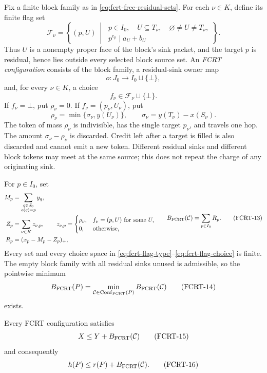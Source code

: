 Fix a finite block family as in \eqref{eq:fcrt-free-residual-sets}.  For each
$\nu\in K$, define its finite flag set
\[
 \mathcal F_\nu=
 \left\{(p,U)\ \middle|\
 \begin{array}{l}
 p\in I_0,\quad U\subseteq T_\nu,\quad
 \varnothing\ne U\ne T_\nu,\\[2pt]
 p^{e_p}\mid a_U+b_U
 \end{array}
 \right\}.
\tag{FCRT-10}\label{eq:fcrt-flag-type}
\]
Thus $U$ is a nonempty proper face of the block's sink packet, and the target
$p$ is residual, hence lies outside every selected block source set.  An
\emph{FCRT configuration} consists of the block family, a residual-sink
owner map
\[
                        o:J_0\longrightarrow I_0\sqcup\{\bot\},
\]
and, for every $\nu\in K$, a choice
\[
 f_\nu\in\mathcal F_\nu\sqcup\{\bot\}.
\tag{FCRT-11}\label{eq:fcrt-flag-choice}
\]
If $f_\nu=\bot$, put $\rho_\nu=0$.  If
$f_\nu=(p_\nu,U_\nu)$, put
\[
 \rho_\nu=\min\{\sigma_\nu,y(U_\nu)\},
 \qquad \sigma_\nu=y(T_\nu)-x(S_\nu).
\tag{FCRT-12}\label{eq:fcrt-reuse-cap}
\]
The token of mass $\rho_\nu$ is indivisible, has the single target $p_\nu$,
and travels one hop.  The amount $\sigma_\nu-\rho_\nu$ is discarded.  Credit
left after a target is filled is also discarded and cannot emit a new token.
Different residual sinks and different block tokens may meet at the same
source; this does not repeat the charge of any originating sink.

For $p\in I_0$, set
\[
 \begin{split}
 M_p&=\sum_{\substack{q\in J_0\\o(q)=p}}y_q,\\
 Z_p&=\sum_{\nu\in K}z_{\nu,p},
 \qquad
 z_{\nu,p}=
 \begin{cases}
  \rho_\nu,&f_\nu=(p,U)\text{ for some }U,\\
  0,&\text{otherwise},
 \end{cases}\\
 R_p&=(x_p-M_p-Z_p)_+,
 \end{split}
 \qquad
 B_{\rm FCRT}(\mathcal C)=\sum_{p\in I_0}R_p.
\tag{FCRT-13}\label{eq:fcrt-boundary}
\]
Every set and every choice space in
\eqref{eq:fcrt-flag-type}--\eqref{eq:fcrt-flag-choice} is finite.  The empty
block family with all residual sinks unused is admissible, so the pointwise
minimum
\[
 B_{\rm FCRT}(P)=\min_{\mathcal C\in\operatorname{Conf}_{\rm FCRT}(P)}
                         B_{\rm FCRT}(\mathcal C)
\tag{FCRT-14}\label{eq:fcrt-optimum}
\]
exists.

\begin{proposition}
\label{prop:fcrt-once-charge}
Every FCRT configuration satisfies
\[
                         X\le Y+B_{\rm FCRT}(\mathcal C)
\tag{FCRT-15}\label{eq:fcrt-mass-bridge}
\]
and consequently
\[
                         h(P)\le r(P)+B_{\rm FCRT}(\mathcal C).
\tag{FCRT-16}\label{eq:fcrt-height-bridge}
\]
\end{proposition}

